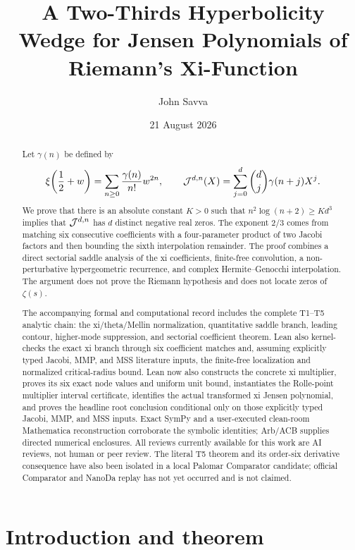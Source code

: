 \documentclass[12pt]{article}
\title{A Two-Thirds Hyperbolicity Wedge for Jensen Polynomials of Riemann's Xi-Function}
\author{John Savva}
\date{21 August 2026}
\begin{document}
\maketitle

\begin{abstract}
Let $\gamma(n)$ be defined by
\[
  \xi\!\left(\frac12+w\right)
  =\sum_{n\ge0}\frac{\gamma(n)}{n!}w^{2n},
\qquad
  \mathcal J^{d,n}(X)=\sum_{j=0}^{d}\binom dj\gamma(n+j)X^j.
\]
We prove that there is an absolute constant $K>0$ such that
$n^2\log(n+2)\ge Kd^3$ implies that $\mathcal J^{d,n}$ has $d$ distinct
negative real zeros.  The exponent $2/3$ comes from matching six consecutive
coefficients with a four-parameter product of two Jacobi factors and then
bounding the sixth interpolation remainder.  The proof combines a direct
sectorial saddle analysis of the xi coefficients, finite-free convolution,
a non-perturbative hypergeometric recurrence, and complex
Hermite--Genocchi interpolation.  The argument does not prove the Riemann
hypothesis and does not locate zeros of $\zeta(s)$.

The accompanying formal and computational record includes the complete
T1--T5 analytic chain:
the xi/theta/Mellin normalization, quantitative saddle branch, leading
contour, higher-mode suppression, and sectorial coefficient theorem.  Lean
also kernel-checks the exact xi branch through six coefficient matches and,
assuming explicitly typed Jacobi, MMP, and MSS literature inputs, the
finite-free localization and normalized critical-radius bound.  Lean now
also constructs the concrete xi multiplier, proves its six exact node values
and uniform unit bound, instantiates the Rolle-point multiplier interval
certificate, identifies the actual transformed xi Jensen polynomial, and
proves the headline root conclusion conditional only on those explicitly
typed Jacobi, MMP, and MSS inputs.  Exact SymPy and a user-executed
clean-room Mathematica reconstruction corroborate the symbolic identities;
Arb/ACB supplies directed numerical enclosures.  All reviews currently
available for this work are AI reviews, not human or peer review.
The literal T5 theorem and its order-six derivative consequence have also
been isolated in a local Palomar Comparator candidate; official Comparator
and NanoDa replay has not yet occurred and is not claimed.
\end{abstract}

\tableofcontents

\section{Introduction and theorem}\label{sec:introduction}
\end{document}
